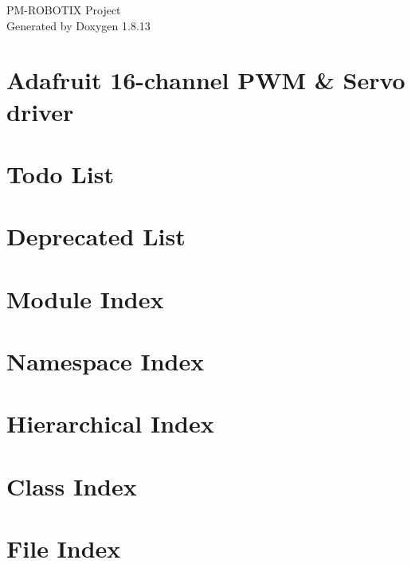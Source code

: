 \documentclass[twoside]{book}
\newcommand{\+}{\discretionary{\mbox{\scriptsize$\hookleftarrow$}}{}{}}
\newcommand{\clearemptydoublepage}{%
  \newpage{\pagestyle{empty}\cleardoublepage}%
}
\begin{document}
\hypersetup{pageanchor=false,
             bookmarksnumbered=true,
             pdfencoding=unicode
            }
\begin{titlepage}
\vspace*{7cm}
\begin{center}%
{\Large P\+M-\/\+R\+O\+B\+O\+T\+IX Project }\\
\vspace*{1cm}
{\large Generated by Doxygen 1.8.13}\\
\end{center}
\end{titlepage}
\clearemptydoublepage
{}
\tableofcontents
\clearemptydoublepage
{}
\hypersetup{pageanchor=true}

\chapter{Adafruit 16-\/channel P\+WM \& Servo driver}
\label{index}\hypertarget{index}{}
\chapter{Todo List}
\label{todo}

\chapter{Deprecated List}
\label{deprecated}

\chapter{Module Index}

\chapter{Namespace Index}

\chapter{Hierarchical Index}

\chapter{Class Index}

\chapter{File Index}

\end{document}

